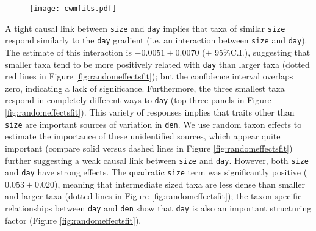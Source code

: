 \documentclass[12pt]{ecology}
\begin{document}
\begin{figure}
\caption[The relationship between community-weighted mean body length and Julian day, with the fitted values of three models (Eqs. \ref{eq:sdm}, \ref{eq:fdmnointeraction}, \ref{eq:fdminteraction}).]{}%
\texttt{[image: cwmfits.pdf]}
\label{fig:cwmfits}
\end{figure}

A tight causal link between \texttt{size} and \texttt{day} implies that taxa of similar \texttt{size} respond similarly to the \texttt{day} gradient (i.e. an interaction between \texttt{size} and \texttt{day}).  The estimate of this interaction is $-0.0051 \pm 0.0070$ ($\pm$ 95\%C.I.), suggesting that smaller taxa tend to be more positively related with \texttt{day} than larger taxa (dotted red lines in Figure \ref{fig:randomeffectsfit}); but the confidence interval overlaps zero, indicating a lack of significance.  Furthermore, the three smallest taxa respond in completely different ways to \texttt{day} (top three panels in Figure \ref{fig:randomeffectsfit}).  This variety of responses implies that traits other than \texttt{size} are important sources of variation in \texttt{den}.  We use random taxon effects to estimate the importance of these unidentified sources, which appear quite important (compare solid versus dashed lines in Figure \ref{fig:randomeffectsfit}) further suggesting a weak causal link between \texttt{size} and \texttt{day}.  However, both \texttt{size} and \texttt{day} have strong effects.  The quadratic \texttt{size} term was significantly positive ($0.053 \pm 0.020$), meaning that intermediate sized taxa are less dense than smaller and larger taxa (dotted lines in Figure \ref{fig:randomeffectsfit}); the taxon-specific relationships between \texttt{day} and \texttt{den} show that \texttt{day} is also an important structuring factor (Figure \ref{fig:randomeffectsfit}).




\end{document}

